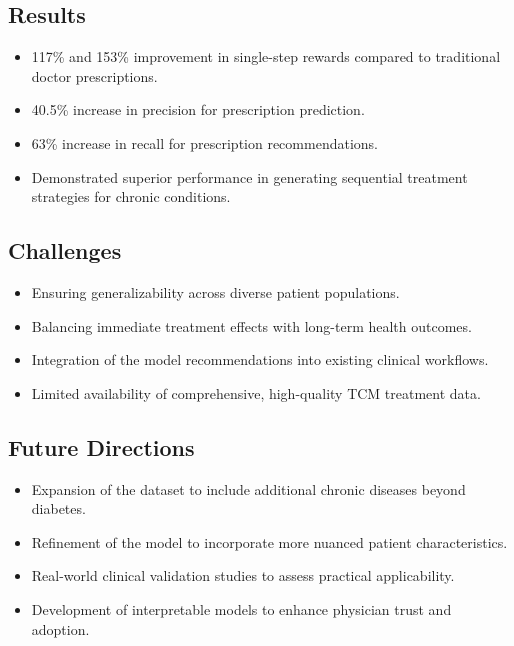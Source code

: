 \subsection*{Results}
\begin{itemize}
    \item 117\% and 153\% improvement in single-step rewards compared to traditional doctor prescriptions.
    \item 40.5\% increase in precision for prescription prediction.
    \item 63\% increase in recall for prescription recommendations.
    \item Demonstrated superior performance in generating sequential treatment strategies for chronic conditions.
\end{itemize}

\subsection*{Challenges}
\begin{itemize}
    \item Ensuring generalizability across diverse patient populations.
    \item Balancing immediate treatment effects with long-term health outcomes.
    \item Integration of the model recommendations into existing clinical workflows.
    \item Limited availability of comprehensive, high-quality TCM treatment data.
\end{itemize}

\subsection*{Future Directions}
\begin{itemize}
    \item Expansion of the dataset to include additional chronic diseases beyond diabetes.
    \item Refinement of the model to incorporate more nuanced patient characteristics.
    \item Real-world clinical validation studies to assess practical applicability.
    \item Development of interpretable models to enhance physician trust and adoption.
\end{itemize}

